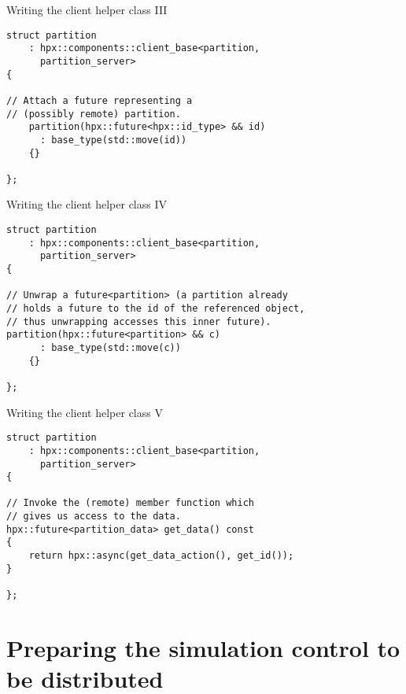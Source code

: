 \documentclass[\classoption]{beamer}
\begin{document}
\begin{frame}[fragile]{Writing the client helper class III}

\begin{lstlisting}
struct partition 
	: hpx::components::client_base<partition, 
	  partition_server>
{

// Attach a future representing a 
// (possibly remote) partition.
    partition(hpx::future<hpx::id_type> && id)
      : base_type(std::move(id))
    {}
    
};
\end{lstlisting}

\end{frame}

\begin{frame}[fragile]{Writing the client helper class IV}

\begin{lstlisting}
struct partition 
	: hpx::components::client_base<partition, 
	  partition_server>
{

// Unwrap a future<partition> (a partition already 
// holds a future to the id of the referenced object, 
// thus unwrapping accesses this inner future).
partition(hpx::future<partition> && c)
      : base_type(std::move(c))
    {}

};
\end{lstlisting}

\end{frame}

\begin{frame}[fragile]{Writing the client helper class V}

\begin{lstlisting}
struct partition 
	: hpx::components::client_base<partition, 
	  partition_server>
{

// Invoke the (remote) member function which 
// gives us access to the data.
hpx::future<partition_data> get_data() const
{
    return hpx::async(get_data_action(), get_id());
}

};
\end{lstlisting}

\end{frame}

\section{Preparing the simulation control to be distributed}
\end{document}
